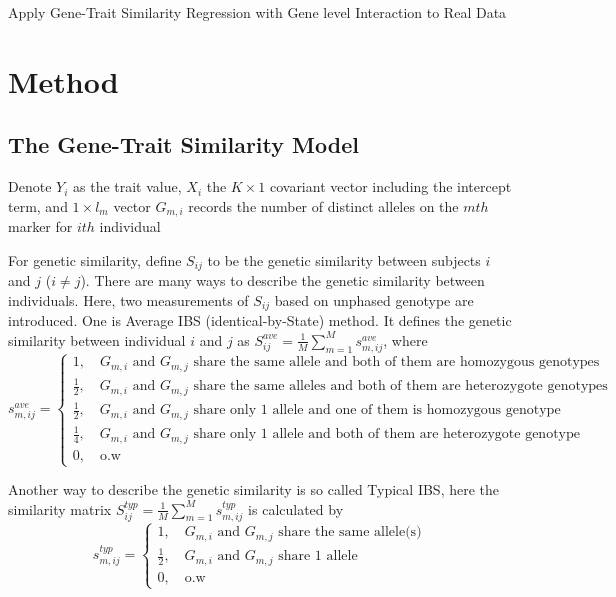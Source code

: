\documentclass{article}
\begin{document}
    \begin{center}
        \Large{Apply Gene-Trait Similarity Regression with Gene level Interaction to Real Data}
    \end{center}

    \fontsize{11pt}{\baselineskip}\selectfont

    \section{Method}

        \subsection{The Gene-Trait Similarity Model}
         Denote $Y_i$ as the trait value, $X_i$ the $K\times 1$ covariant vector including the intercept term, and  $1\times l_m$ vector $G_{m,i}$ records the number of distinct alleles on the $mth$ marker for $ith$ individual

         For genetic similarity, define $S_{ij}$ to be the genetic similarity between subjects $i$ and $j$ ($i\neq j$). There are many ways to describe the genetic similarity between individuals. Here, two measurements of $S_{ij}$ based on unphased genotype are introduced. One is Average IBS (identical-by-State) method. It defines the genetic similarity between individual $i$ and $j$ as $S^{ave}_{ij}=\frac{1}{M}\sum^M_{m=1}s^{ave}_{m,ij}$, where
         \[ s^{ave}_{m,ij}=\begin{cases}
                1,\quad G_{m,i} \mbox{ and } G_{m,j} \mbox{ share the same allele and both of them are homozygous genotypes} \\
                \frac{1}{2},\quad G_{m,i} \mbox{ and } G_{m,j} \mbox{ share the same alleles and both of them are heterozygote genotypes} \\
                \frac{1}{2},\quad G_{m,i} \mbox{ and } G_{m,j} \mbox{ share only 1 allele and one of them is homozygous genotype} \\
                \frac{1}{4},\quad G_{m,i} \mbox{ and } G_{m,j} \mbox{ share only 1 allele and both of them are heterozygote genotype} \\
                0,\quad \mbox{o.w}
         \end{cases} \]

         Another way to describe the genetic similarity is so called Typical IBS, here the similarity matrix $S^{typ}_{ij}=\frac{1}{M}\sum^M_{m=1}s^{typ}_{m,ij}$ is calculated by
         \[ s^{typ}_{m,ij}=\begin{cases}
                1,\quad G_{m,i} \mbox{ and } G_{m,j} \mbox{ share the same allele(s)}\\
                \frac{1}{2},\quad G_{m,i} \mbox{ and } G_{m,j} \mbox{ share 1 allele} \\
                0,\quad \mbox{o.w}
         \end{cases} \]
\end{document}
